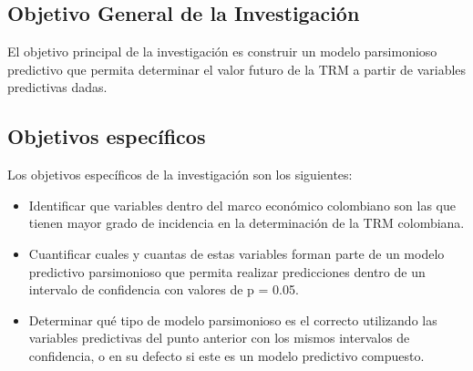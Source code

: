 \begin{spacing}{1.5}
\section{Objetivo General de la Investigación}
El objetivo principal de la investigación es construir un modelo parsimonioso predictivo que permita determinar el valor futuro de la TRM a partir de variables predictivas dadas.

\subsection{Objetivos específicos}
Los objetivos específicos de la investigación son los siguientes:

\begin{itemize}
	\item Identificar que variables dentro del marco económico colombiano son las que tienen mayor grado de incidencia en la determinación de la TRM colombiana. 
	\item Cuantificar cuales y cuantas de estas variables forman parte de un modelo predictivo parsimonioso que permita realizar predicciones dentro de un intervalo de confidencia con valores de p = 0.05. 
	\item Determinar qué tipo de modelo parsimonioso es el correcto utilizando las variables predictivas del punto anterior con los mismos intervalos de confidencia, o en su defecto si este es un modelo predictivo compuesto. 
\end{itemize}
\end{spacing}
